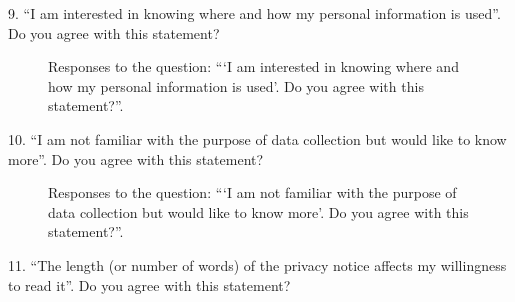 \vspace{2cm}

9. ``I am interested in knowing where and how my personal information is used''. Do you agree with this statement?

\begin{figure}[H]
    \centering
    \caption*{Responses to the question: ```I am interested in knowing where and how my personal information is used'. Do you agree with this statement?''.}
    \label{fig:survey_s2_q9}
\end{figure}

\clearpage

10. ``I am not familiar with the purpose of data collection but would like to know more''. Do you agree with this statement?

\begin{figure}[H]
    \begin{center}
        \caption*{Responses to the question: ```I am not familiar with the purpose of data collection but would like to know more'. Do you agree with this statement?''.}
        \label{fig:survey_s2_q10}
    \end{center}
\end{figure}

\vspace{2cm}

11. ``The length (or number of words) of the privacy notice affects my willingness to read it''. Do you agree with this statement?

